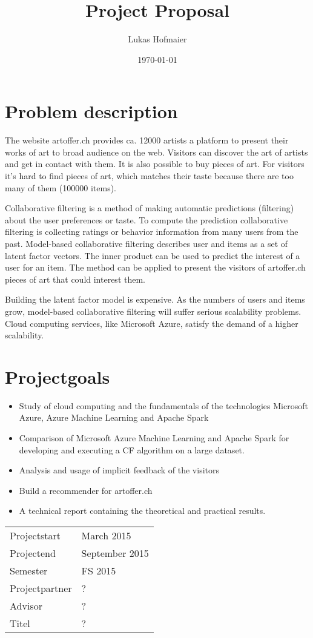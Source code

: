 \documentclass[11pt]{article}
\title{Project Proposal}
\author{Lukas Hofmaier}
\date{\today}
\begin{document}
\maketitle

\section{Problem description}
\label{sec-1}

The website artoffer.ch provides ca. 12000 artists a platform to present their works of art to broad audience on the web. 
Visitors can discover the art of artists and get in contact with them. 
It is also possible to buy pieces of art. 
For visitors it’s hard to find pieces of art, which matches their taste because there are too many of them (100000 items).

Collaborative filtering is a method of making automatic predictions (filtering) about the user preferences or taste.
To compute the prediction collaborative filtering is collecting ratings or behavior information from many users from the past. 
Model-based collaborative filtering describes user and items as a set of latent factor vectors. 
The inner product can be used to predict the interest of a user for an item.
The method can be applied to present the visitors of artoffer.ch pieces of art that could interest them.

Building the latent factor model is expensive. 
As the numbers of users and items grow, model-based collaborative filtering will suffer serious scalability problems. 
Cloud computing services, like Microsoft Azure, satisfy the demand of a higher scalability. 
\section{Projectgoals}
\label{sec-2}

\begin{itemize}
\item Study of cloud computing and the fundamentals of the technologies Microsoft Azure, Azure Machine Learning and Apache Spark
\item Comparison of Microsoft Azure Machine Learning and Apache Spark for developing and executing a CF algorithm on a large dataset. 
\item Analysis and usage of implicit feedback of the visitors
\item Build a recommender for artoffer.ch
\item A technical report containing the theoretical and practical results.
\end{itemize}


\begin{center}
\begin{tabular}{ll}
 Projectstart    &  March 2015      \\
 Projectend      &  September 2015  \\
 Semester        &  FS 2015         \\
 Projectpartner  &  ?               \\
 Advisor         &  ?               \\
 Titel           &  ?               \\
\end{tabular}
\end{center}
\end{document}
